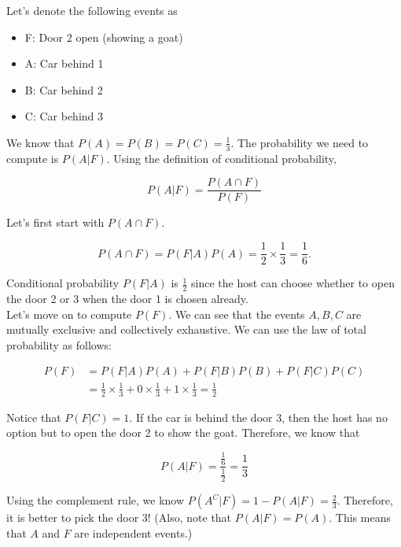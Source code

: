 \documentclass[12pt]{article}
\begin{document}
Let's denote the following events as

\begin{itemize}
\item F: Door 2 open (showing a goat)
\item A: Car behind 1
\item B: Car behind 2
\item C: Car behind 3
\end{itemize}

We know that $P(A) = P(B) = P(C) = \frac{1}{3}$.
The probability we need to compute is $P(A|F)$. Using the definition of  conditional probability, 

\[
P(A|F) = \frac{P(A \cap F)}{P(F)}
\] 

Let's first start with $P(A \cap F)$. 

\[
P(A\cap F) = P(F|A)P(A) = \frac{1}{2} \times \frac{1}{3} = \frac{1}{6}.
\]

Conditional probability $P(F|A)$ is $\frac{1}{2}$ since the host can choose whether to open the door 2 or 3 when the door 1 is chosen already.\\
Let's move on to compute $P(F)$. We can see that the events $A, B, C$ are mutually exclusive and collectively exhaustive. We can use the law of total probability as follows:

\begin{align*}
P(F) &= P(F|A)P(A) + P(F|B)P(B) + P(F|C)P(C)\\
& = \frac{1}{2} \times \frac{1}{3} + 0 \times \frac{1}{3} + 1 \times \frac{1}{3} = \frac{1}{2}
\end{align*}

Notice that $P(F|C) = 1$. If the car is behind the door 3, then the host has no option but to open the door 2 to show the goat. Therefore, we know that

\[
P(A|F) = \frac{\frac{1}{6}}{\frac{1}{2}} = \frac{1}{3}
\]

Using the complement rule, we know $P(A^C|F) = 1-P(A|F) = \frac{2}{3}$. Therefore, it is better to pick the door 3! (Also, note that $P(A|F) = P(A)$. This means that $A$ and $F$ are independent events.)
\end{document}
